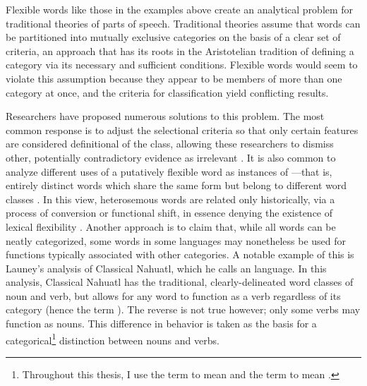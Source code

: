 \vspace{1em}

Flexible words like those in the examples above create an analytical problem for traditional theories of parts of speech. Traditional theories assume that words can be partitioned into mutually exclusive categories on the basis of a clear set of criteria, an approach that has its roots in the Aristotelian tradition of defining a category via its necessary and sufficient conditions. Flexible words would seem to violate this assumption because they appear to be members of more than one category at once, and the criteria for classification yield conflicting results.

Researchers have proposed numerous solutions to this problem. The most common response is to adjust the selectional criteria so that only certain features are considered definitional of the class, allowing these researchers to dismiss other, potentially contradictory evidence as irrelevant . It is also common to analyze different uses of a putatively flexible word as instances of —that is, entirely distinct words which share the same form but belong to different word classes . In this view, heterosemous words are related only historically, via a process of conversion or functional shift, in essence denying the existence of lexical flexibility . Another approach is to claim that, while all words can be neatly categorized, some words in some languages may nonetheless be used for functions typically associated with other categories. A notable example of this is Launey's  analysis of Classical Nahuatl, which he calls an  language. In this analysis, Classical Nahuatl has the traditional, clearly-delineated word classes of noun and verb, but allows for any word to function as a verb regardless of its category (hence the term ). The reverse is not true however; only some verbs may function as nouns.  This difference in behavior is taken as the basis for a categorical\footnote{Throughout this thesis, I use the term  to mean  and the term  to mean .} distinction between nouns and verbs.

